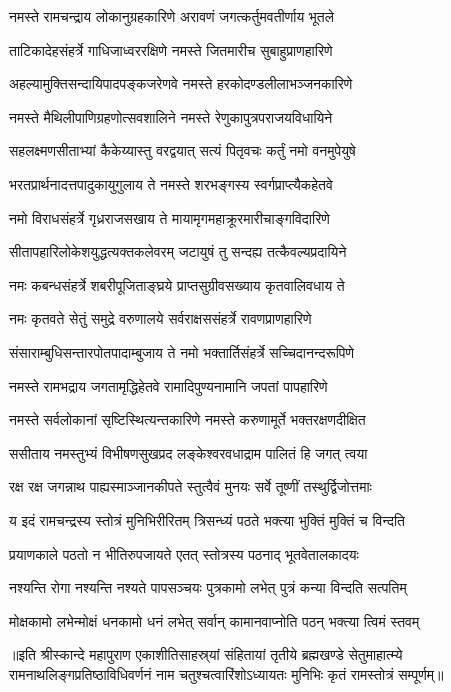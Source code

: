 
\addtocounter{shlokacount}{62}

\twolineshloka
{नमस्ते रामचन्द्राय लोकानुग्रहकारिणे}
{अरावणं जगत्कर्तुमवतीर्णाय भूतले} %

\twolineshloka
{ताटिकादेहसंहर्त्रे गाधिजाध्वररक्षिणे}
{नमस्ते जितमारीच सुबाहुप्राणहारिणे} %

\twolineshloka
{अहल्यामुक्तिसन्दायिपादपङ्कजरेणवे}
{नमस्ते हरकोदण्डलीलाभञ्जनकारिणे} %

\twolineshloka
{नमस्ते मैथिलीपाणिग्रहणोत्सवशालिने}
{नमस्ते रेणुकापुत्रपराजयविधायिने} %

\twolineshloka
{सहलक्ष्मणसीताभ्यां कैकेय्यास्तु वरद्वयात्}
{सत्यं पितृवचः कर्तुं नमो वनमुपेयुषे} %

\twolineshloka
{भरतप्रार्थनादत्तपादुकायुगुलाय ते}
{नमस्ते शरभङ्गस्य स्वर्गप्राप्त्यैकहेतवे} %

\twolineshloka
{नमो विराधसंहर्त्रे गृध्रराजसखाय ते}
{मायामृगमहाक्रूरमारीचाङ्गविदारिणे} %

\twolineshloka
{सीतापहारिलोकेशयुद्धत्यक्तकलेवरम्}
{जटायुषं तु सन्दह्य तत्कैवल्यप्रदायिने} %

\twolineshloka
{नमः कबन्धसंहर्त्रे शबरीपूजिताङ्घ्रये}
{प्राप्तसुग्रीवसख्याय कृतवालिवधाय ते} %

\twolineshloka
{नमः कृतवते सेतुं समुद्रे वरुणालये}
{सर्वराक्षससंहर्त्रे रावणप्राणहारिणे} %

\twolineshloka
{संसाराम्बुधिसन्तारपोतपादाम्बुजाय ते}
{नमो भक्तार्तिसंहर्त्रे सच्चिदानन्दरूपिणे} %

\twolineshloka
{नमस्ते रामभद्राय जगतामृद्धिहेतवे}
{रामादिपुण्यनामानि जपतां पापहारिणे} %

\twolineshloka
{नमस्ते सर्वलोकानां सृष्टिस्थित्यन्तकारिणे}
{नमस्ते करुणामूर्ते भक्तरक्षणदीक्षित} %

\twolineshloka
{ससीताय नमस्तुभ्यं विभीषणसुखप्रद}
{लङ्केश्वरवधाद्राम पालितं हि जगत् त्वया} %

\twolineshloka
{रक्ष रक्ष जगन्नाथ पाह्यस्माञ्जानकीपते}
{स्तुत्वैवं मुनयः सर्वे तूष्णीं तस्थुर्द्विजोत्तमाः} %


\twolineshloka
{य इदं रामचन्द्रस्य स्तोत्रं मुनिभिरीरितम्}
{त्रिसन्ध्यं पठते भक्त्या भुक्तिं मुक्तिं च विन्दति} %

\twolineshloka
{प्रयाणकाले पठतो न भीतिरुपजायते}
{एतत् स्तोत्रस्य पठनाद् भूतवेतालकादयः} %

\twolineshloka
{नश्यन्ति रोगा नश्यन्ति नश्यते पापसञ्चयः}
{पुत्रकामो लभेत् पुत्रं कन्या विन्दति सत्पतिम्} %

\twolineshloka
{मोक्षकामो लभेन्मोक्षं धनकामो धनं लभेत्}
{सर्वान् कामानवाप्नोति पठन् भक्त्या त्विमं स्तवम्} %

॥इति श्रीस्कान्दे महापुराण एकाशीतिसाहस्र्यां संहितायां तृतीये ब्रह्मखण्डे सेतुमाहात्म्ये रामनाथलिङ्गप्रतिष्ठाविधिवर्णनं नाम चतुश्चत्वारिंशोऽध्यायतः मुनिभिः कृतं रामस्तोत्रं सम्पूर्णम्॥
